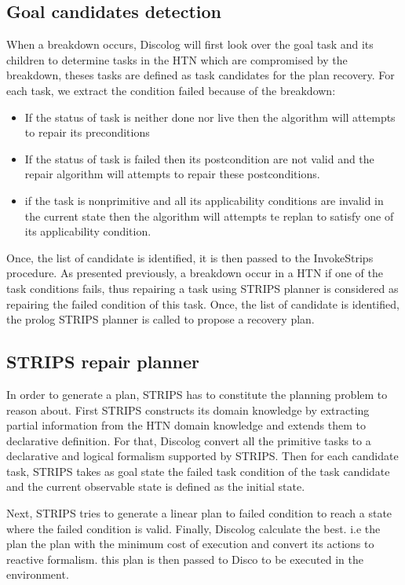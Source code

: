 \subsection{Goal candidates detection}
When a breakdown occurs, Discolog  will  first look over the goal task and its children to determine tasks in the HTN which are compromised by the breakdown, theses tasks are defined as task candidates for the plan recovery. 
For each task, we extract the condition failed because of the breakdown: 
\begin{itemize}
	\item	If the status of task is neither done nor live then the algorithm will attempts to repair its preconditions
	\item	If the status of task is failed then its postcondition are not valid and the repair algorithm will attempts to repair these postconditions.
	\item	if the task is nonprimitive and all its applicability conditions are invalid in the current state then the algorithm will attempts te replan to satisfy one of its applicability condition. 
\end{itemize}

Once, the list of candidate is identified, it is then passed to the InvokeStrips procedure.
As presented previously, a breakdown occur in a HTN if one of the task conditions fails, thus repairing a task using STRIPS planner is considered as repairing the failed condition of this task.
Once, the list of candidate is identified, the prolog STRIPS planner is called to propose a recovery plan.
\subsection{STRIPS repair planner}
In order to generate a plan, STRIPS has to constitute the planning problem to reason about. First  STRIPS constructs its domain knowledge by extracting partial information from the HTN domain knowledge and extends them to declarative definition. For that, Discolog convert all the primitive tasks to a declarative and logical formalism supported by STRIPS. Then for each candidate task, STRIPS takes as goal state  the failed task condition of the task candidate  and the current observable state is defined as the initial state.

Next, STRIPS tries to generate a linear plan to failed condition to reach a state where the failed condition is valid. Finally, Discolog calculate the best. i.e the  plan the plan with the minimum cost of execution and convert its actions to reactive formalism. this plan is then passed to Disco to be executed in the environment.

